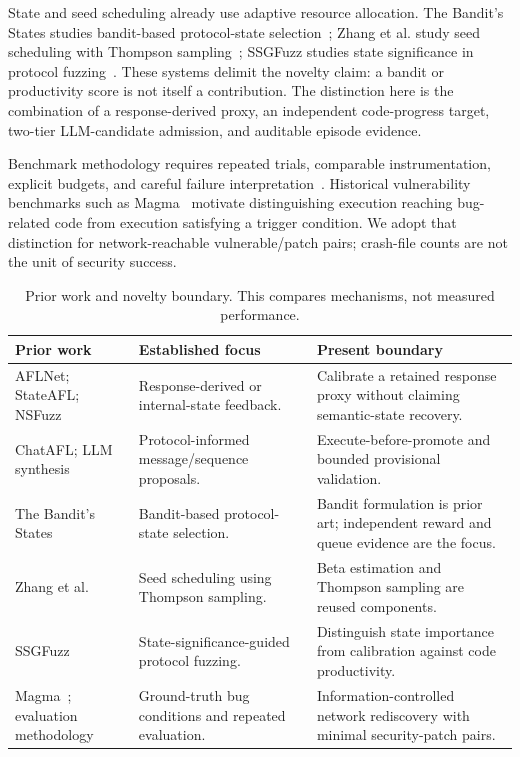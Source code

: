 \documentclass[final,5p,times,number]{elsarticle}
\begin{document}
State and seed scheduling already use adaptive resource allocation. The Bandit's States studies bandit-based protocol-state selection~\cite{bandits_states2023}; Zhang et al. study seed scheduling with Thompson sampling~\cite{zhang2026thompson}; SSGFuzz studies state significance in protocol fuzzing~\cite{ssgfuzz2026}. These systems delimit the novelty claim: a bandit or productivity score is not itself a contribution. The distinction here is the combination of a response-derived proxy, an independent code-progress target, two-tier LLM-candidate admission, and auditable episode evidence.

Benchmark methodology requires repeated trials, comparable instrumentation, explicit budgets, and careful failure interpretation~\cite{profuzzbench_benchmark_stateful_protocol_2021,sok_prudent_evaluation_practices_2024,reliability_benchmarking_2022}. Historical vulnerability benchmarks such as Magma~\cite{magma2020} motivate distinguishing execution reaching bug-related code from execution satisfying a trigger condition. We adopt that distinction for network-reachable vulnerable/patch pairs; crash-file counts are not the unit of security success.

\begin{table}[!tp]
\centering\small
\caption{Prior work and novelty boundary. This compares mechanisms, not measured performance.}
\label{tab:novelty}
\begin{tabularx}{\textwidth}{l Y Y}
\toprule
Prior work & Established focus & Present boundary \\
\midrule
AFLNet; StateAFL; NSFuzz & Response-derived or internal-state feedback. & Calibrate a retained response proxy without claiming semantic-state recovery. \\
ChatAFL; LLM synthesis & Protocol-informed message/sequence proposals. & Execute-before-promote and bounded provisional validation. \\
The Bandit's States~\cite{bandits_states2023} & Bandit-based protocol-state selection. & Bandit formulation is prior art; independent reward and queue evidence are the focus. \\
Zhang et al.~\cite{zhang2026thompson} & Seed scheduling using Thompson sampling. & Beta estimation and Thompson sampling are reused components. \\
SSGFuzz~\cite{ssgfuzz2026} & State-significance-guided protocol fuzzing. & Distinguish state importance from calibration against code productivity. \\
Magma~\cite{magma2020}; evaluation methodology & Ground-truth bug conditions and repeated evaluation. & Information-controlled network rediscovery with minimal security-patch pairs. \\
\bottomrule
\end{tabularx}
\end{table}
\end{document}
